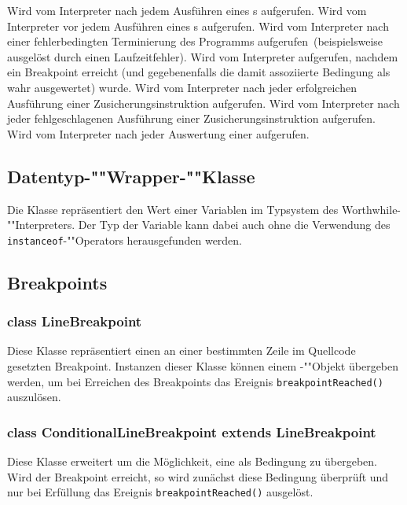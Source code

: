 \begin{description}
    Wird vom Interpreter nach jedem Ausführen eines s aufgerufen.
    Wird vom Interpreter vor jedem Ausführen eines s aufgerufen.
    Wird vom Interpreter nach einer fehlerbedingten Terminierung des Programms aufgerufen~(beispielsweise ausgelöst durch einen Laufzeitfehler).
    Wird vom Interpreter aufgerufen, nachdem ein Breakpoint erreicht (und gegebenenfalls die damit assoziierte Bedingung als wahr ausgewertet) wurde.
    Wird vom Interpreter nach jeder erfolgreichen Ausführung einer Zusicherungsinstruktion aufgerufen.
    Wird vom Interpreter nach jeder fehlgeschlagenen Ausführung einer Zusicherungsinstruktion aufgerufen.
    Wird vom Interpreter nach jeder Auswertung einer  aufgerufen.
\end{description}

\subsection{Datentyp-""Wrapper-""Klasse }
Die Klasse  repräsentiert den Wert einer Variablen im Typsystem des Worthwhile-""Interpreters. Der Typ der Variable kann dabei auch ohne die Verwendung des \texttt{instanceof}-""Operators herausgefunden werden.

\subsection{Breakpoints}
\subsubsection{class LineBreakpoint}
Diese Klasse repräsentiert einen an einer bestimmten Zeile im Quellcode gesetzten Breakpoint. Instanzen dieser Klasse können einem -""Objekt übergeben werden, um bei Erreichen des Breakpoints das Ereignis \texttt{breakpointReached()} auszulösen.

\subsubsection{class ConditionalLineBreakpoint extends LineBreakpoint}
Diese Klasse erweitert  um die Möglichkeit, eine  als Bedingung zu übergeben. Wird der Breakpoint erreicht, so wird zunächst diese Bedingung überprüft und nur bei Erfüllung das Ereignis \texttt{breakpointReached()} ausgelöst.

